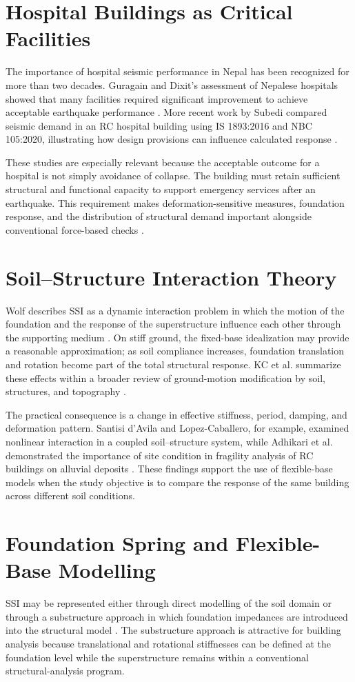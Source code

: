 \section{Hospital Buildings as Critical Facilities}
The importance of hospital seismic performance in Nepal has been recognized for more than two decades. Guragain and Dixit's assessment of Nepalese hospitals showed that many facilities required significant improvement to achieve acceptable earthquake performance \cite{guragain2004}. More recent work by Subedi compared seismic demand in an RC hospital building using IS 1893:2016 and NBC 105:2020, illustrating how design provisions can influence calculated response \cite{subedi2022}.

These studies are especially relevant because the acceptable outcome for a hospital is not simply avoidance of collapse. The building must retain sufficient structural and functional capacity to support emergency services after an earthquake. This requirement makes deformation-sensitive measures, foundation response, and the distribution of structural demand important alongside conventional force-based checks \cite{guragain2004,subedi2022}.

\section{Soil--Structure Interaction Theory}
Wolf describes SSI as a dynamic interaction problem in which the motion of the foundation and the response of the superstructure influence each other through the supporting medium \cite{wolf1985}. On stiff ground, the fixed-base idealization may provide a reasonable approximation; as soil compliance increases, foundation translation and rotation become part of the total structural response. KC et al. summarize these effects within a broader review of ground-motion modification by soil, structures, and topography \cite{kc2025}.

The practical consequence is a change in effective stiffness, period, damping, and deformation pattern. Santisi d'Avila and Lopez-Caballero, for example, examined nonlinear interaction in a coupled soil--structure system, while Adhikari et al. demonstrated the importance of site condition in fragility analysis of RC buildings on alluvial deposits \cite{santisi2016,adhikari2022}. These findings support the use of flexible-base models when the study objective is to compare the response of the same building across different soil conditions.

\section{Foundation Spring and Flexible-Base Modelling}
SSI may be represented either through direct modelling of the soil domain or through a substructure approach in which foundation impedances are introduced into the structural model \cite{wolf1985,gajan2008}. The substructure approach is attractive for building analysis because translational and rotational stiffnesses can be defined at the foundation level while the superstructure remains within a conventional structural-analysis program.

